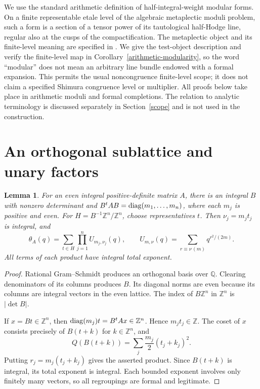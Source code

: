 \documentclass[11pt]{article}
\newtheorem{lemma}[theorem]{Lemma}
\theoremstyle{remark}\newtheorem{remark}[theorem]{Remark}
\newcommand{\Z}{\mathbb Z}\newcommand{\Q}{\mathbb Q}
\begin{document}
We use the standard arithmetic definition of half-integral-weight
modular forms. On a finite representable etale level of the algebraic
metaplectic moduli problem, such a form is a section of a tensor power
of its tautological half-Hodge line, regular also at the cusps of the
compactification. The metaplectic object and its finite-level meaning
are specified in \cite[Definition 3.1.1 and Remark 3.1.2]{candelori}.
We give the test-object description and verify the finite-level map in
Corollary~\ref{arithmetic-modularity}, so the word ``modular'' does not
mean an arbitrary line bundle endowed with a formal expansion.
This permits the usual noncongruence finite-level scope; it does not
claim a specified Shimura congruence level or multiplier. All proofs
below take place in arithmetic moduli and formal completions. The
relation to analytic terminology is discussed separately in
Section~\ref{scope} and is not used in the construction.

\section{An orthogonal sublattice and unary factors}\label{orthogonal}
\begin{lemma}\label{orthogonal-lemma}
For an even integral positive-definite matrix $A$, there is an integral
$B$ with nonzero determinant and $B^tAB=\operatorname{diag}(m_1,\ldots,m_n)$, where
each $m_j$ is positive and even. For
$H=B^{-1}\Z^n/\Z^n$, choose representatives $t$. Then
$\nu_j=m_jt_j$ is integral, and
\[
 \theta_A(q)=\sum_{t\in H}\prod_{j=1}^n U_{m_j,\nu_j}(q),\qquad
 U_{m,\nu}(q)=\sum_{r\equiv\nu\, (m)}q^{r^2/(2m)}.
\]
All terms of each product have integral total exponent.
\end{lemma}
\begin{proof}
Rational Gram--Schmidt produces an orthogonal basis over $\Q$. Clearing
denominators of its columns produces $B$. Its diagonal norms are even
because its columns are integral vectors in the even lattice. The index of
$B\Z^n$ in $\Z^n$ is $|\det B|$.

If $x=Bt\in\Z^n$, then
$\diag(m_j)t=B^tAx\in\Z^n$. Hence $m_jt_j\in\Z$.
The coset of $x$ consists precisely of $B(t+k)$ for $k\in\Z^n$, and
\[
 Q(B(t+k))=\sum_j\frac{m_j}{2}(t_j+k_j)^2.
\]
Putting $r_j=m_j(t_j+k_j)$ gives the asserted product. Since $B(t+k)$
is integral, its total exponent is integral. Each bounded exponent involves
only finitely many vectors, so all regroupings are formal and legitimate.
\end{proof}
\end{document}
